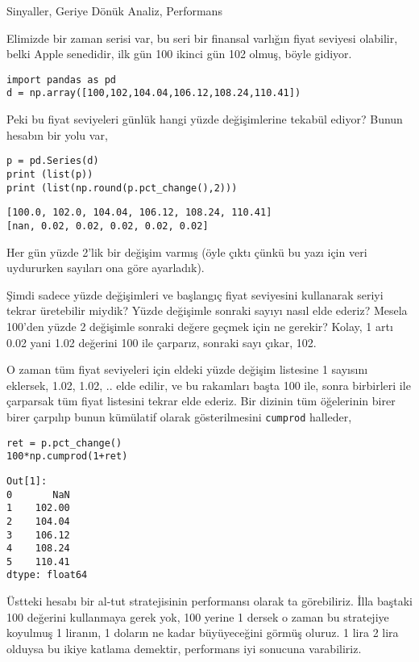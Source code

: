 \documentclass[12pt,fleqn]{article}\usepackage{../../common}
\begin{document}
Sinyaller, Geriye Dönük Analiz, Performans

Elimizde bir zaman serisi var, bu seri bir finansal varlığın fiyat seviyesi
olabilir, belki Apple senedidir, ilk gün 100 ikinci gün 102 olmuş, böyle
gidiyor.

\begin{verbatim}
import pandas as pd
d = np.array([100,102,104.04,106.12,108.24,110.41])
\end{verbatim}

Peki bu fiyat seviyeleri günlük hangi yüzde değişimlerine tekabül ediyor?
Bunun hesabın bir yolu var, 

\begin{verbatim}
p = pd.Series(d)
print (list(p))
print (list(np.round(p.pct_change(),2)))
\end{verbatim}

\begin{verbatim}
[100.0, 102.0, 104.04, 106.12, 108.24, 110.41]
[nan, 0.02, 0.02, 0.02, 0.02, 0.02]
\end{verbatim}

Her gün yüzde 2'lik bir değişim varmış (öyle çıktı çünkü bu yazı için veri
uydururken sayıları ona göre ayarladık).

Şimdi sadece yüzde değişimleri ve başlangıç fiyat seviyesini kullanarak seriyi
tekrar üretebilir miydik? Yüzde değişimle sonraki sayıyı nasıl elde ederiz?
Mesela 100'den yüzde 2 değişimle sonraki değere geçmek için ne gerekir?  Kolay,
1 artı 0.02 yani 1.02 değerini 100 ile çarparız, sonraki sayı çıkar, 102.

O zaman tüm fiyat seviyeleri için eldeki yüzde değişim listesine 1 sayısını
eklersek, 1.02, 1.02, .. elde edilir, ve bu rakamları başta 100 ile, sonra
birbirleri ile çarparsak tüm fiyat listesini tekrar elde ederiz. Bir dizinin tüm
öğelerinin birer birer çarpılıp bunun kümülatif olarak gösterilmesini
\verb!cumprod!  halleder,

\begin{verbatim}
ret = p.pct_change()
100*np.cumprod(1+ret)
\end{verbatim}

\begin{verbatim}
Out[1]: 
0       NaN
1    102.00
2    104.04
3    106.12
4    108.24
5    110.41
dtype: float64
\end{verbatim}

Üstteki hesabı bir al-tut stratejisinin performansı olarak ta görebiliriz. İlla
baştaki 100 değerini kullanmaya gerek yok, 100 yerine 1 dersek o zaman bu
stratejiye koyulmuş 1 liranın, 1 doların ne kadar büyüyeceğini görmüş oluruz.  1
lira 2 lira olduysa bu ikiye katlama demektir, performans iyi sonucuna
varabiliriz.
\end{document}
